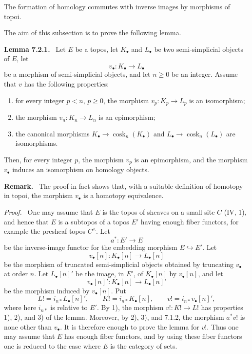 \documentclass[11pt]{article}
\newcommand{\cosk}{\operatorname{cosk}}
\newenvironment{statement}[1]{\par\medskip\noindent\textbf{#1.}\ }{\par\medskip}
\newenvironment{remarktext}[1]{\par\medskip\noindent\textbf{#1.}\ }{\par\medskip}
\newenvironment{prooftext}{\par\noindent\emph{Proof.}\ }{\par\medskip}
\begin{document}
The formation of homology commutes with inverse images by morphisms of topoi.

The aim of this subsection is to prove the following lemma.

\begin{statement}{Lemma 7.2.1}
Let $E$ be a topos, let $K_\bullet$ and $L_\bullet$ be two semi-simplicial objects of $E$, let
\[
        v_\bullet:K_\bullet\to L_\bullet
\]
be a morphism of semi-simplicial objects, and let $n\geq 0$ be an integer. Assume that $v$ has the following properties:
\begin{enumerate}[label=\arabic*)]
\item for every integer $p<n$, $p\geq 0$, the morphism $v_p:K_p\to L_p$ is an isomorphism;
\item the morphism $v_n:K_n\to L_n$ is an epimorphism;
\item the canonical morphisms $K_\bullet\to \cosk_n(K_\bullet)$ and $L_\bullet\to \cosk_n(L_\bullet)$ are isomorphisms.
\end{enumerate}
Then, for every integer $p$, the morphism $v_p$ is an epimorphism, and the morphism $v_\bullet$ induces an isomorphism on homology objects.
\end{statement}

\begin{remarktext}{Remark}
The proof in fact shows that, with a suitable definition of homotopy in topoi, the morphism $v_\bullet$ is a homotopy equivalence.
\end{remarktext}

\begin{prooftext}
One may assume that $E$ is the topos of sheaves on a small site $C$ (IV, 1), and hence that $E$ is a subtopos of a topos $E'$ having enough fiber functors, for example the presheaf topos $C^{\wedge}$. Let
\[
        a^*:E'\to E
\]
be the inverse-image functor for the embedding morphism $E\hookrightarrow E'$. Let
\[
        v_\bullet[n]:K_\bullet[n]\to L_\bullet[n]
\]
be the morphism of truncated semi-simplicial objects obtained by truncating $v_\bullet$ at order $n$. Let $L_\bullet[n]'$ be the image, in $E'$, of $K_\bullet[n]$ by $v_\bullet[n]$, and let
\[
        v_\bullet[n]':K_\bullet[n]\to L_\bullet[n]'
\]
be the morphism induced by $v_\bullet[n]$. Put
\[
        L!=i_{n*}L_\bullet[n]',\qquad K!=i_{n*}K_\bullet[n],\qquad v!=i_{n*}v_\bullet[n]',
\]
where here $i_{n*}$ is relative to $E'$. By 1), the morphism $v!:K!\to L!$ has properties 1), 2), and 3) of the lemma. Moreover, by 2), 3), and 7.1.2, the morphism $a^*v!$ is none other than $v_\bullet$. It is therefore enough to prove the lemma for $v!$. Thus one may assume that $E$ has enough fiber functors, and by using these fiber functors one is reduced to the case where $E$ is the category of sets.
\end{prooftext}
\end{document}
